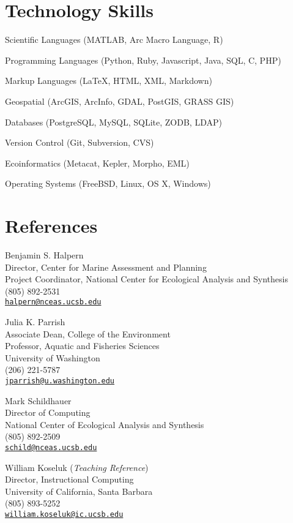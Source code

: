 \documentclass[letterpaper]{article}
\renewenvironment{itemize}{
  \begin{list}{}{
    \setlength{\leftmargin}{1.5em}
  }
}{
  \end{list}
}
\begin{document}
\section*{Technology Skills}
\begin{itemize}
  \item Scientific Languages (\textsf{MATLAB}, Arc Macro Language, \textsf{R})
  \item Programming Languages (Python, Ruby, Javascript, Java, SQL, C, PHP)
  \item Markup Languages (\LaTeX , HTML, XML, Markdown)
  \item Geospatial (ArcGIS, ArcInfo, GDAL, PostGIS, GRASS GIS)
  \item Databases (PostgreSQL, MySQL, SQLite, ZODB, LDAP)
  \item Version Control (Git, Subversion, CVS)
  \item Ecoinformatics (Metacat, Kepler, Morpho, EML)
  \item Operating Systems (FreeBSD, Linux, OS X, Windows)
\end{itemize}

\newpage

\section*{References}

\begin{itemize}
\item Benjamin S. Halpern \\
  Director, Center for Marine Assessment and Planning\\
  Project Coordinator, National Center for Ecological Analysis and Synthesis\\
  (805) 892-2531\\
  \href{mailto:halpern@nceas.ucsb.edu}{\texttt{halpern@nceas.ucsb.edu}}
\item Julia K. Parrish\\
  Associate Dean, College of the Environment\\
  Professor, Aquatic and Fisheries Sciences\\
  University of Washington\\
  (206) 221-5787\\
  \href{mailto:jparrish@u.washington.edu}{\texttt{jparrish@u.washington.edu}}
\item Mark Schildhauer\\
  Director of Computing\\
  National Center of Ecological Analysis and Synthesis\\
  (805) 892-2509\\
  \href{mailto:schild@nceas.ucsb.edu}{\texttt{schild@nceas.ucsb.edu}}
\item William Koseluk (\emph{Teaching Reference}) \\
  Director, Instructional Computing \\
  University of California, Santa Barbara\\
  (805) 893-5252\\
  \href{mailto:william.koseluk@ic.ucsb.edu}{\texttt{william.koseluk@ic.ucsb.edu}}
\end{itemize}
\end{document}
